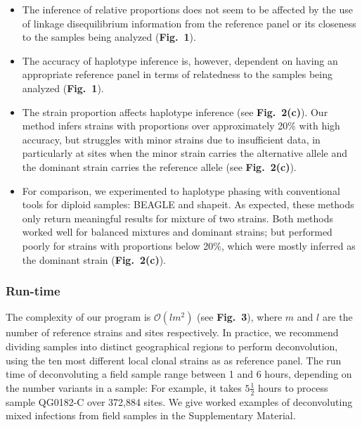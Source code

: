 \documentclass{nature}
\begin{document}
\begin{itemize}

\item The inference of relative proportions does not seem to be affected by the use of linkage disequilibrium information from the reference panel or its closeness to the samples being analyzed ({\bf Fig.~1}).

\item The accuracy of haplotype inference is, however, dependent on having an appropriate reference panel in terms of relatedness to the samples being analyzed ({\bf Fig.~1}).

\item The strain proportion affects haplotype inference (see {\bf Fig.~2(c)}). Our method infers strains with proportions over approximately 20\% with high accuracy, but struggles with minor strains due to insufficient data, in particularly at sites when the minor strain carries the alternative allele and the dominant strain carries the reference allele (see {\bf Fig.~2(c)}).

\item For comparison, we experimented to haplotype phasing with conventional tools for diploid samples: BEAGLE and shapeit. As expected, these methods only return meaningful results for mixture of two strains. Both methods worked well for balanced mixtures and dominant strains; but performed poorly for strains with proportions below 20\%, which were mostly inferred as the dominant strain ({\bf Fig.~2(c)}).

\end{itemize}




\subsubsection*{Run-time}

The complexity of our program is $\mathcal{O}(lm^2)$ (see {\bf Fig.~3}), where $m$ and $l$ are the number of reference strains and sites respectively. In practice, we recommend dividing samples into distinct geographical regions to perform deconvolution, using the ten most different local clonal strains as as reference panel. The run time of deconvoluting a field sample range between 1 and 6 hours, depending on the number variants in a sample: For example, it takes $5\frac{1}{2}$ hours to process sample {\textmd QG0182-C} over 372,884 sites.  We give worked examples of deconvoluting mixed infections from field samples in the Supplementary Material.
\end{document}

